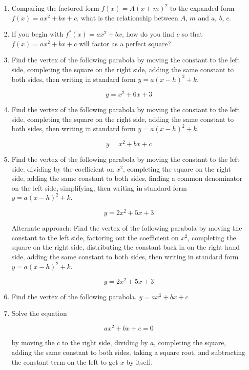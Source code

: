 \documentclass[number]{ximera}
\begin{document}
\begin{enumerate}
\item Comparing the factored form $f(x) = A(x+m)^2$ to the expanded form $f(x) = ax^2 + bx + c$, what is the relationship between $A$, $m$ and $a$, $b$, $c$. 

\item If you begin with $f^*(x) = ax^2 + bx$, how do you find $c$ so that $f(x) = ax^2 + bx + c$ will factor as a perfect square?

\newpage

\item Find the vertex of the following parabola by moving the constant to the left side, completing the square on the right side, adding the same constant to both sides, then writing in standard form $y = a(x-h)^2 + k$.

$$y = x^2 + 6x + 3$$

\item Find the vertex of the following parabola by moving the constant to the left side, completing the square on the right side, adding the same constant to both sides, then writing in standard form $y = a(x-h)^2 + k$.

$$y = x^2 + bx + c$$

\item Find the vertex of the following parabola by moving the constant to the left side, dividing by the coefficient on $x^2$, completing the square on the right side, adding the same constant to both sides, finding a common denominator on the left side, simplifying, then writing in standard form $y = a(x-h)^2 + k$.

$$y = 2x^2 + 5x + 3$$

Alternate approach: Find the vertex of the following parabola by moving the constant to the left side, factoring out the coefficient on $x^2$, completing the square on the right side, distributing the constant back in on the right hand side, adding the same constant to both sides, then writing in standard form $y = a(x-h)^2 + k$.

$$y = 2x^2 + 5x + 3$$

\item Find the vertex of the following parabola. $y = ax^2 + bx + c$

\item Solve the equation

\[ ax^2 + bx + c = 0 \]

by moving the $c$ to the right side, dividing by $a$, completing the square, adding the same constant to both sides, taking a square root, and subtracting the constant term on the left to get $x$ by itself.

\end{enumerate}
\end{document}
